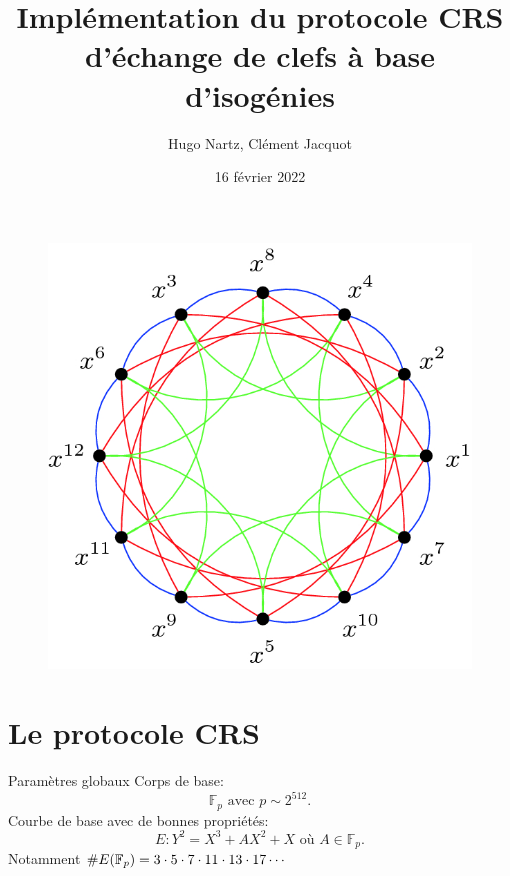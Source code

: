 \documentclass{beamer}
\title{Implémentation du protocole CRS d'échange de clefs à base d'isogénies }
\author{Hugo Nartz, Cl\'ement Jacquot}
\date{16 f\'evrier 2022}
\begin{document}
\begin{frame}
  \titlepage
\begin{figure}[h]
\centering
\includegraphics[scale=0.12]{../figs/isoGraph}
\end{figure}
\end{frame}


\section{Le protocole CRS}

\begin{frame}{Param\`etres globaux}
	Corps de base:
	\[
		\mathbb{F}_p \text{ avec } p\sim 2^{512}.
	\]
	Courbe de base avec de bonnes propri\'et\'es:
	\[
		E: Y^2 = X^3 + AX^2 + X  \text{ o\`u } A\in  \mathbb{F}_p.
	\]
	Notamment $\# E(\mathbb{F}_p) = 3\cdot 5\cdot 7\cdot 11 \cdot 13\cdot 17\cdots$
\end{frame}
\end{document}
